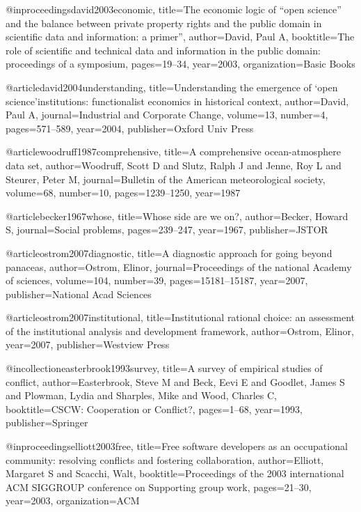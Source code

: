 @inproceedings{david2003economic,
  title={The economic logic of “open science” and the balance between private property rights and the public domain in scientific data and information: a primer”},
  author={David, Paul A},
  booktitle={The role of scientific and technical data and information in the public domain: proceedings of a symposium},
  pages={19--34},
  year={2003},
  organization={Basic Books}
}

@article{david2004understanding,
  title={Understanding the emergence of ‘open science’institutions: functionalist economics in historical context},
  author={David, Paul A},
  journal={Industrial and Corporate Change},
  volume={13},
  number={4},
  pages={571--589},
  year={2004},
  publisher={Oxford Univ Press}
}


@article{woodruff1987comprehensive,
  title={A comprehensive ocean-atmosphere data set},
  author={Woodruff, Scott D and Slutz, Ralph J and Jenne, Roy L and Steurer, Peter M},
  journal={Bulletin of the American meteorological society},
  volume={68},
  number={10},
  pages={1239--1250},
  year={1987}
}

@article{becker1967whose,
  title={Whose side are we on?},
  author={Becker, Howard S},
  journal={Social problems},
  pages={239--247},
  year={1967},
  publisher={JSTOR}
}


@article{ostrom2007diagnostic,
  title={A diagnostic approach for going beyond panaceas},
  author={Ostrom, Elinor},
  journal={Proceedings of the national Academy of sciences},
  volume={104},
  number={39},
  pages={15181--15187},
  year={2007},
  publisher={National Acad Sciences}
}

@article{ostrom2007institutional,
  title={Institutional rational choice: an assessment of the institutional analysis and development framework},
  author={Ostrom, Elinor},
  year={2007},
  publisher={Westview Press}
}

@incollection{easterbrook1993survey,
  title={A survey of empirical studies of conflict},
  author={Easterbrook, Steve M and Beck, Eevi E and Goodlet, James S and Plowman, Lydia and Sharples, Mike and Wood, Charles C},
  booktitle={CSCW: Cooperation or Conflict?},
  pages={1--68},
  year={1993},
  publisher={Springer}
}

@inproceedings{elliott2003free,
  title={Free software developers as an occupational community: resolving conflicts and fostering collaboration},
  author={Elliott, Margaret S and Scacchi, Walt},
  booktitle={Proceedings of the 2003 international ACM SIGGROUP conference on Supporting group work},
  pages={21--30},
  year={2003},
  organization={ACM}
}

